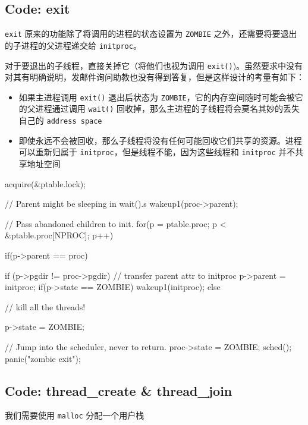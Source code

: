 \subsection{Code: exit}

\texttt{exit} 原来的功能除了将调用的进程的状态设置为 \texttt{ZOMBIE} 之外，还需要将要退出的子进程的父进程递交给 \texttt{initproc}。

对于要退出的子线程，直接关掉它（将他们也视为调用 \texttt{exit()})。虽然要求中没有对其有明确说明，发邮件询问助教也没有得到答复，但是这样设计的考量有如下：

\begin{itemize}
    \item 如果主进程调用 \texttt{exit()} 退出后状态为 \texttt{ZOMBIE}，它的内存空间随时可能会被它的父进程通过调用 \texttt{wait()} 回收掉，那么主进程的子线程将会莫名其妙的丢失自己的 \texttt{address space}
    \item 即使永远不会被回收，那么子线程将没有任何可能回收它们共享的资源。进程可以重新归属于 \texttt{initproc}，但是线程不能，因为这些线程和 \texttt{initproc} 并不共享地址空间
\end{itemize}

\begin{ccode}
    acquire(&ptable.lock);
            
    // Parent might be sleeping in wait().s
    wakeup1(proc->parent);
            
    // Pass abandoned children to init.
    for(p = ptable.proc; p < &ptable.proc[NPROC]; p++){
        if(p->parent == proc){
            if (p->pgdir != proc->pgdir) {
                // transfer parent attr to initproc
                p->parent = initproc;
                if(p->state == ZOMBIE)
                wakeup1(initproc);
                } else {
                // kill all the threads!
                                                        
                p->state = ZOMBIE;
            }
        }
    }
            
    // Jump into the scheduler, never to return.
    proc->state = ZOMBIE;
    sched();
    panic("zombie exit");
\end{ccode}


\subsection{Code: thread\_create \& thread\_join}

我们需要使用 \texttt{malloc} 分配一个用户栈

